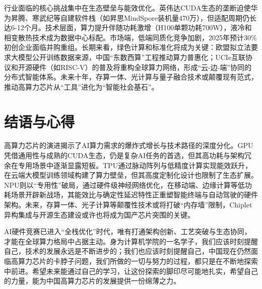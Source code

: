 \documentclass{article}
\begin{document}
行业面临的核心挑战集中在生态壁垒与能效优化。英伟达CUDA生态的垄断迫使华为昇腾、寒武纪等自建软件栈（如昇思MindSpore装机量470万），但适配周期仍长达6-12个月。技术层面，算力提升伴随功耗激增（H100单颗功耗700W），液冷和相变散热技术成为数据中心标配。市场端，低端同质化竞争加剧，2025年预计30\%初创企业面临并购重组。长期来看，绿色计算和标准化将成为关键：欧盟拟立法要求大模型公开训练数据来源，中国“东数西算”工程推动算力普惠化；UCIe互联协议和开源硬件（如RISC-V）的普及将重构全球算力网络，形成“云-边-端”协同的分布式智能体系。未来十年，存算一体、光计算与量子融合技术或颠覆现有范式，推动高算力芯片从“工具”进化为“智能社会基石”\cite{gong2023nanoscale}。
\section{结语与心得}
高算力芯片的演进揭示了AI算力需求的爆炸式增长与技术路径的深度分化。GPU凭借通用性与成熟的CUDA生态，仍是复杂AI任务的首选，但其高功耗与架构冗余在专用场景中逐渐显露短板。TPU通过脉动阵列与低精度计算实现能效跃升，在云端大模型训练领域构建了算力壁垒，但其高度定制化设计也限制了生态扩展。NPU则以“专用性”破局，通过硬件级神经网络优化，在移动端、边缘计算等低功耗场景开辟新战场，其能效比与确定性延迟特性正重塑智能终端与自动驾驶的硬件架构。未来，存算一体、光子计算等颠覆性技术或将打破“内存墙”限制，Chiplet异构集成与开源生态建设或许也将成为国产芯片突围的关键。

AI硬件竞赛已进入“全栈优化”时代，唯有打通架构创新、工艺突破与生态协同，才能在全球算力格局中占据主动。身为计算机学院的一名学子，我们应该时刻提醒自己，技术的发展永远是不断进步的；我们也应该时刻提醒自己，中国现在仍然面临高算力芯片的卡脖子问题，我们所做的一切与努力的过程，都只是在不断地探索中前进。希望未来能通过自己的学习，让这份探索的脚印尽可能地扎实，希望自己的力量，能为中国高算力芯片的发展提供一份绵薄之力。


\newpage



\newpage
\appendix
\end{document}
